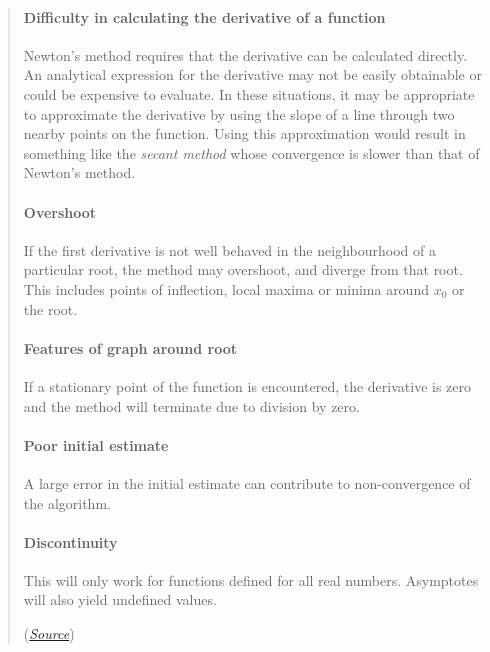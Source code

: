 \documentclass[
]{article}
\begin{document}
\begin{quote}
\mbox{}%
\hypertarget{header-n40}{%
\paragraph{Difficulty in calculating the derivative of a
function}\label{header-n40}}
\hfill \break
Newton's method requires that the derivative can be calculated directly.
An analytical expression for the derivative may not be easily obtainable
or could be expensive to evaluate. In these situations, it may be
appropriate to approximate the derivative by using the slope of a line
through two nearby points on the function. Using this approximation
would result in something like the \emph{secant method} whose
convergence is slower than that of Newton's method.

\hypertarget{header-n42}{%
\paragraph{Overshoot}\label{header-n42}}
\hfill \break
If the first derivative is not well behaved in the neighbourhood of a
particular root, the method may overshoot, and diverge from that root.
This includes points of inflection, local maxima or minima around
\(x_0\) or the root.

\hypertarget{header-n44}{%
\paragraph{Features of graph around root}\label{header-n44}}
\hfill \break
If a stationary point of the function is encountered, the derivative is
zero and the method will terminate due to division by zero.

\hypertarget{header-n46}{%
\paragraph{Poor initial estimate}\label{header-n46}}
\hfill \break
A large error in the initial estimate can contribute to non-convergence
of the algorithm.

\hypertarget{header-n48}{%
\paragraph{Discontinuity}\label{header-n48}}
\hfill \break
This will only work for functions defined for all real numbers.
Asymptotes will also yield undefined values.

(\href{https://en.wikipedia.org/wiki/Newton\%27s_method\#Failure_of_the_method_to_converge_to_the_root}{\emph{Source}})
\end{quote}
\end{document}
